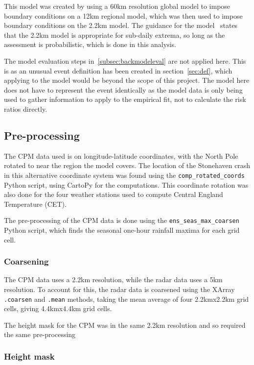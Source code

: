 This model was created by using a 60km resolution global model to impose boundary conditions on a 12km regional model,
    which was then used to impose boundary conditions on the 2.2km model.
The guidance for the model~\cite{model_data} states that the 2.2km model is appropriate for sub-daily extrema,
    so long as the assessment is probabilistic,
    which is done in this analysis.

The model evaluation steps in~\ref{subsec:backmodeleval} are not applied here.
This is as an unusual event definition has been created in section~\ref{sec:def},
    which applying to the model would be beyond the scope of this project.
The model here does not have to represent the event identically as the model data is only being used to gather information
    to apply to the empirical fit,
    not to calculate the risk ratios directly.

\subsection{Pre-processing}\label{subsec:preprocess}

The CPM data used is on longitude-latitude coordinates,
    with the North Pole rotated to near the region the model covers.
The location of the Stonehaven crash in this alternative coordinate system was found using the \texttt{comp\_rotated\_coords}~\cite{Me_Code} Python script,
    using CartoPy for the computations.
This coordinate rotation was also done for the four weather stations used to compute Central England Temperature (CET).

The pre-processing of the CPM data is done using the \texttt{ens\_seas\_max\_coarsen}~\cite{Me_Code} Python script,
    which finds the seasonal one-hour rainfall maxima for each grid cell.

\subsubsection{Coarsening}

The CPM data uses a 2.2km resolution,
    while the radar data uses a 5km resolution.
To account for this,
    the radar data is coarsened using the XArray \texttt{.coarsen} and \texttt{.mean} methods,
    taking the mean average of four 2.2kmx2.2km grid cells, giving 4.4kmx4.4km grid cells.

The height mask for the CPM was in the same 2.2km resolution
    and so required the same pre-processing

\subsubsection{Height mask}

